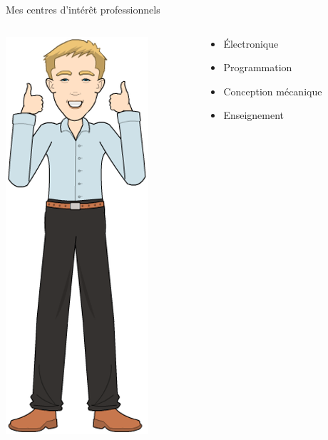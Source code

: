 \documentclass[aspectratio=169,utf8,french]{beamer}
\begin{document}
\begin{frame}{Mes centres d'intérêt professionnels}
  \begin{columns}
    \begin{column}{.3\textwidth}
      \begin{flushright}
        \includegraphics[height=.8\textheight]{pictures/francois2.png}
      \end{flushright}
    \end{column}
    \begin{column}{.7\textwidth}
      \begin{itemize}
        \item Électronique
        \item Programmation
        \item Conception mécanique
        \item Enseignement
      \end{itemize}
    \end{column}
  \end{columns}
\end{frame}
\end{document}
